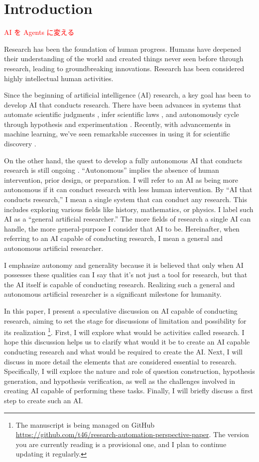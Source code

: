 \section{Introduction}

\textcolor{red}{AI を Agents に変える}

Research has been the foundation of human progress. Humans have deepened their understanding of the world and created things never seen before through research, leading to groundbreaking innovations. Research has been considered highly intellectual human activities.

Since the beginning of artificial intelligence (AI) research, a key goal has been to develop AI that conducts research. There have been advances in systems that automate scientific judgments \cite{lindsay1993dendral}, infer scientific laws \cite{langley1987scientific}, and autonomously cycle through hypothesis and experimentation \cite{king2004functional}. Recently, with advancements in machine learning, we've seen remarkable successes in using it for scientific discovery \cite{wang2023scientific,xu2021artificial,zhang2023artificial}.

On the other hand, the quest to develop a fully autonomous AI that conducts research is still ongoing \cite{zenil2023}. ``Autonomous'' implies the absence of human intervention, prior design, or preparation. I will refer to an AI as being more autonomous if it can conduct research with less human intervention. By ``AI that conducts research,'' I mean a single system that can conduct any research. This includes exploring various fields like history, mathematics, or physics. I label such AI as a ``general artificial researcher.'' The more fields of research a single AI can handle, the more general-purpose I consider that AI to be. Hereinafter, when referring to an AI capable of conducting research, I mean a general and autonomous artificial researcher.

I emphasize autonomy and generality because it is believed that only when AI possesses these qualities can I say that it's not just a tool for research, but that the AI itself is capable of conducting research. Realizing such a general and autonomous artificial researcher is a significant milestone for humanity.

In this paper, I present a speculative discussion on AI capable of conducting research, aiming to set the stage for discussions of limitation and possibility for its realization \footnote{
The manuscript is being managed on GitHub \url{https://github.com/t46/research-automation-perspective-paper}. The version you are currently reading is a provisional one, and I plan to continue updating it regularly.
}. 
First, I will explore what would be activities called research. I hope this discussion helps us to clarify what would it be to create an AI capable conducting research and what would be required to create the AI. Next, I will discuss in more detail the elements that are considered essential to research. Specifically, I will explore the nature and role of question construction, hypothesis generation, and hypothesis verification, as well as the challenges involved in creating AI capable of performing these tasks. Finally, I will briefly discuss a first step to create such an AI.